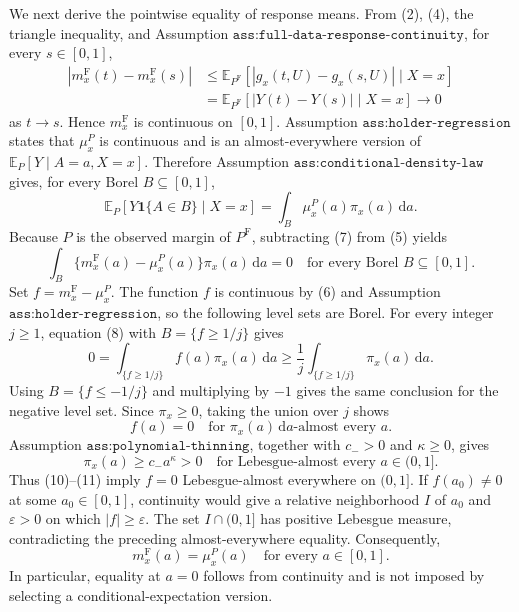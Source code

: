We next derive the pointwise equality of response means. From (2), (4), the triangle inequality, and Assumption \(\texttt{ass:full-data-response-continuity}\), for every \(s\in[0,1]\),
\[
\begin{aligned}
 |m_x^{\mathrm F}(t)-m_x^{\mathrm F}(s)|
 &\leq \mathbb E_{P^{\mathrm F}}
   [|g_x(t,U)-g_x(s,U)|\mid X=x]\\
 &=\mathbb E_{P^{\mathrm F}}
   [|Y(t)-Y(s)|\mid X=x]
 \longrightarrow0
\end{aligned}
\tag{6}
\]
as \(t\to s\). Hence \(m_x^{\mathrm F}\) is continuous on \([0,1]\). Assumption \(\texttt{ass:holder-regression}\) states that \(\mu_x^P\) is continuous and is an almost-everywhere version of \(\mathbb E_P[Y\mid A=a,X=x]\). Therefore Assumption \(\texttt{ass:conditional-density-law}\) gives, for every Borel \(B\subseteq[0,1]\),
\[
 \mathbb E_P[Y\mathbf 1\{A\in B\}\mid X=x]
 =\int_B\mu_x^P(a)\pi_x(a)\,\mathrm da.
\tag{7}
\]
Because \(P\) is the observed margin of \(P^{\mathrm F}\), subtracting (7) from (5) yields
\[
 \int_B\{m_x^{\mathrm F}(a)-\mu_x^P(a)\}\pi_x(a)\,\mathrm da=0
 \quad\text{for every Borel }B\subseteq[0,1].
\tag{8}
\]
Set \(f=m_x^{\mathrm F}-\mu_x^P\). The function \(f\) is continuous by (6) and Assumption \(\texttt{ass:holder-regression}\), so the following level sets are Borel. For every integer \(j\geq1\), equation (8) with \(B=\{f\geq1/j\}\) gives
\[
 0=\int_{\{f\geq1/j\}}f(a)\pi_x(a)\,\mathrm da
 \geq \frac1j\int_{\{f\geq1/j\}}\pi_x(a)\,\mathrm da.
\tag{9}
\]
Using \(B=\{f\leq-1/j\}\) and multiplying by \(-1\) gives the same conclusion for the negative level set. Since \(\pi_x\geq0\), taking the union over \(j\) shows
\[
 f(a)=0
 \quad\text{for }\pi_x(a)\,\mathrm da\text{-almost every }a.
\tag{10}
\]
Assumption \(\texttt{ass:polynomial-thinning}\), together with \(c_->0\) and \(\kappa\geq0\), gives
\[
 \pi_x(a)\geq c_-a^\kappa>0
 \quad\text{for Lebesgue-almost every }a\in(0,1].
\tag{11}
\]
Thus (10)--(11) imply \(f=0\) Lebesgue-almost everywhere on \((0,1]\). If \(f(a_0)\neq0\) at some \(a_0\in[0,1]\), continuity would give a relative neighborhood \(I\) of \(a_0\) and \(\varepsilon>0\) on which \(|f|\geq\varepsilon\). The set \(I\cap(0,1]\) has positive Lebesgue measure, contradicting the preceding almost-everywhere equality. Consequently,
\[
 m_x^{\mathrm F}(a)=\mu_x^P(a)
 \quad\text{for every }a\in[0,1].
\tag{12}
\]
In particular, equality at \(a=0\) follows from continuity and is not imposed by selecting a conditional-expectation version.

